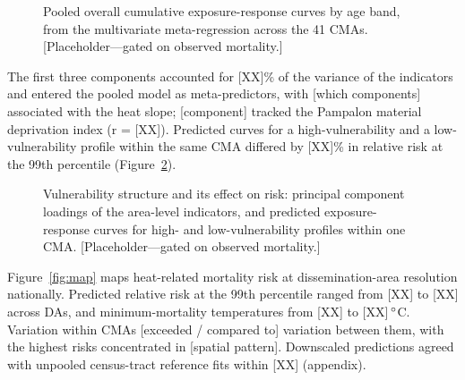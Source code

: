 \documentclass[12pt]{article}
\begin{document}
\begin{figure}[H]
\centering
\caption{Pooled overall cumulative exposure-response curves by
age band, from the multivariate meta-regression across the 41
CMAs. [Placeholder---gated on observed mortality.]}
\label{fig:pooled}
\end{figure}

The first three components accounted for [XX]\% of the variance
of the indicators and entered the pooled model as
meta-predictors, with [which components] associated with the
heat slope; [component] tracked the Pampalon material
deprivation index (r = [XX]). Predicted curves for
a high-vulnerability and a low-vulnerability profile within the
same CMA differed by [XX]\% in relative risk at the 99th
percentile (Figure~\ref{fig:vuln}).

\begin{figure}[H]
\centering
\caption{Vulnerability structure and its effect on risk:
principal component loadings of the area-level indicators, and
predicted exposure-response curves for high- and
low-vulnerability profiles within one CMA.
[Placeholder---gated on observed mortality.]}
\label{fig:vuln}
\end{figure}

Figure~\ref{fig:map} maps heat-related mortality risk at
dissemination-area resolution nationally. Predicted relative
risk at the 99th percentile ranged from [XX] to [XX] across DAs,
and minimum-mortality temperatures from [XX] to
[XX]$\,\degree$C. Variation within CMAs [exceeded / compared to]
variation between them, with the highest risks concentrated in
[spatial pattern]. Downscaled predictions agreed with unpooled
census-tract reference fits within [XX] (appendix).
\end{document}
